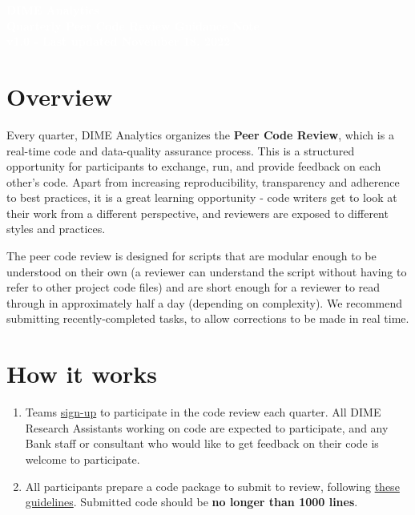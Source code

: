 \documentclass{tufte-handout}
\newcommand{\titleBox}[1]{
	\begin{tcolorbox}
		[colframe = fontcolor,
		colback = fontcolor,
		sharp corners,
		halign = flush center,
		valign = center,
		height = 0.3\textwidth,
		after skip = 1cm]
		#1
	\end{tcolorbox}
}
\begin{document}
	\begin{fullwidth}

\titleBox{
	\textcolor{white}{\LARGE{\textbf{DIME Analytics \\ Quarterly Peer Code Review Guidance Note}} \\
	\Large\textbf{{v1.0 - Last updated November 18, 2022}}}
}

	\section*{Overview}
 Every quarter, DIME Analytics organizes the \textbf{Peer Code Review}, which is a real-time code and data-quality assurance process. This is a structured opportunity for participants to exchange, run, and provide feedback on each other’s code. Apart from increasing reproducibility, transparency and adherence to best practices, it is a great learning opportunity - code writers get to look at their work from a different perspective, and reviewers are exposed to different styles and practices. 
\hfill \break
\begin{flushleft} The peer code review is designed for scripts that are modular enough to be understood on their own (a reviewer can understand the script without having to refer to other project code files) and are short enough for a reviewer to read through in approximately half a day (depending on complexity). We recommend submitting recently-completed tasks, to allow corrections to be made in real time.

\section*{How it works}

	\begin{enumerate}
	    
	  
		\setlength\itemsep{-0.1em}
		\item Teams \href{https://survey.wb.surveycto.com/collect/code_review_sign_up?caseid=}{sign-up} to participate in the code review each quarter. All DIME Research Assistants working on code are expected to participate, and any Bank staff or consultant who would like to get feedback on their code is welcome to participate.
    

		\item All participants prepare a code package to submit to review, following \href{https://github.com/worldbank/dime-standards/blob/master/dime-coding-standards/checklists/Peer%20Code%20Review%20Submission%20Checklist.pdf}{these guidelines}. Submitted code should be \textbf{no longer than 1000 lines}. 
        

\end{enumerate}
\end{flushleft}
\end{fullwidth}
\end{document}
